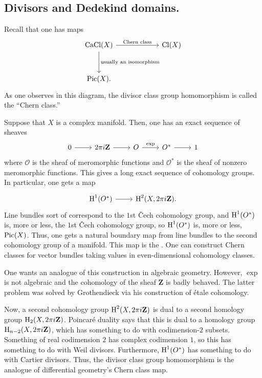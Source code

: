 \documentclass [11 pt, oneside] {article}
\begin{document}
\subsection{Divisors and Dedekind domains.}
Recall that one has maps
\[
\begin{tikzcd}[column sep = 6 em, row sep = 3 em]
	\CaCl(X)\ar[r, "\textrm{Chern class}"] \ar[d, "\textrm{usually an isomorphism}"] & \Cl (X)\\
	\Pic (X).
\end{tikzcd}
\]
As one observes in this diagram, the divisor class group homomorphism is called the ``{Chern class}.''

Suppose that $X$ is a complex manifold. Then, one has an exact sequence of sheaves
\[
\begin{tikzcd}
	0\ar[r]&2\pi i\mathbf{Z}\ar[r]&\mathscr{O}\ar[r,"\exp"]&\mathscr{O}^* \ar[r]&1
\end{tikzcd}
\]
where $\mathscr{O}$ is the sheaf of meromorphic functions and $\mathscr{O}^*$ is the sheaf of nonzero meromorphic functions. This gives a long exact sequence of cohomology groups. In particular, one gets a map
\[
\begin{tikzcd}
	\HH^1(\mathscr{O}^*)\ar[r] & \HH^2(X,2\pi i \mathbf{Z}).
\end{tikzcd}
\]
Line bundles sort of correspond to the $1$st \v Cech cohomology group, and $\operatorname{H}^1(\relax{O}^*)$ is, more or less, the $1$st \v Cech cohomology group, so $\operatorname{H}^1(\relax{O}^*)$ is, more or less, $\operatorname{Pic}(X)$. Thus, one gets a natural boundary map from line bundles to the second cohomology group of a manifold. This map is the . One can construct Chern classes for vector bundles taking values in even-dimensional cohomology classes.

One wants an analogue of this construction in algebraic geometry. However, $\exp$ is not algebraic and the cohomology of the sheaf $\mathbf{Z}$ is badly behaved. The latter problem was solved by Grothendieck via his construction of \'etale cohomology. 

Now, a second cohomology group $\operatorname{H}^2(X,2\pi i \mathbf{Z})$ is dual to a second homology group $\operatorname{H}_2(X,2\pi i\mathbf{Z})$. Poincar\'e duality says that this is dual to a homology group $\operatorname{H}_{n-2}(X,2\pi i \mathbf{Z})$, which has something to do with codimension-$2$ subsets. Something of real codimension $2$ has complex codimension $1$, so this has something to do with Weil divisors. Furthermore, $\operatorname{H}^1(\relax{O}^*)$ has something to do with Cartier divisors. Thus, the divisor class group homomorphism is the analogue of differential geometry's Chern class map.
\end{document}
